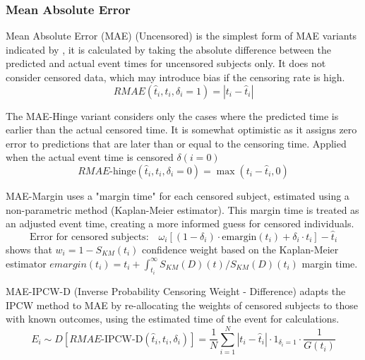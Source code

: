 \subsubsection{Mean Absolute Error}
\par \noindent Mean Absolute Error (MAE) (Uncensored) is the simplest form of MAE variants indicated by \parencite{qi_effective_2023}, it is calculated by taking the absolute difference between the predicted and actual event times for uncensored subjects only. It does not consider censored data, which may introduce bias if the censoring rate is high.
\begin{equation} \label{eq:rmae}
RMAE (\hat{t}_i, t_i, \delta_i = 1) = |t_i - \hat{t}_i|
\end{equation}
\par \noindent The MAE-Hinge variant \parencite{qi_effective_2023} considers only the cases where the predicted time is earlier than the actual censored time. It is somewhat optimistic as it assigns zero error to predictions that are later than or equal to the censoring time. Applied when the actual event time is censored \(\delta (i =0)\)
\begin{equation} \label{eq:maehinge}
RMAE\text{-hinge}(\hat{t}_i, t_i, \delta_i = 0) = \max(t_i - \hat{t}_i, 0)
\end{equation}
\par \noindent MAE-Margin \parencite{qi_effective_2023} uses a "margin time" for each censored subject, estimated using a non-parametric method (Kaplan-Meier estimator). This margin time is treated as an adjusted event time, creating a more informed guess for censored individuals.
\begin{equation} \label{eq:maemargin}
\text{Error for censored subjects:} \quad \omega_i[(1 - \delta_i) \cdot \text{emargin}(t_i) + \delta_i \cdot t_i] - \hat{t}_i
\end{equation}
\noindent \parencite{qi_effective_2023} shows that \(w_{i} = 1-S_{KM}(t_{i})\) confidence weight based on the Kaplan-Meier estimator \(emargin(t_{i})=t_{i}+\int_{t_{i}}^{\infty} S_{KM}(D)(t)/S_{KM}(D)(t_{i})\) margin time.
\par \noindent MAE-IPCW-D (Inverse Probability Censoring Weight - Difference) adapts the IPCW method to MAE by re-allocating the weights of censored subjects to those with known outcomes, using the estimated time of the event for calculations.
\begin{equation} \label{eq:mae}E_i \sim D [RMAE\text{-IPCW-D}(\hat{t}_i, t_i, \delta_i)] = \frac{1}{N} \sum_{i=1}^N |t_i - \hat{t}_i| \cdot 1_{\delta_i=1} \cdot \frac{1}{G(t_i)}\end{equation}
